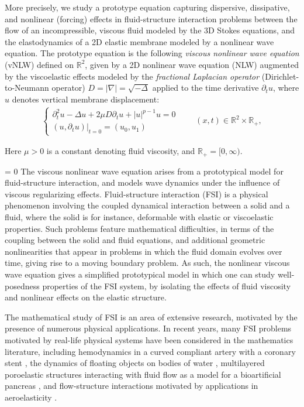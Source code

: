 \documentclass[letterpaper, 11pt,  reqno]{amsart}
\newcommand{\1}{\hspace{0.5mm}\text{I}\hspace{0.2mm}}
\newcommand{\noi}{\noindent}
\newcommand{\R}{\mathbb{R}}
\newcommand{\nb}{\nabla}
\newcommand{\Dl}{\Delta}
\newcommand{\dt}{\partial_t}
\numberwithin{equation}{section}
\numberwithin{theorem}{section}
\begin{document}
More precisely, we study a prototype equation capturing dispersive, dissipative, and nonlinear (forcing) 
effects in fluid-structure interaction problems between the flow of an incompressible, viscous fluid modeled by the 3D Stokes equations, 
and the elastodynamics of a 2D elastic membrane modeled by a nonlinear wave equation. 
The prototype equation is 
the following  {\emph{viscous nonlinear wave equation}} (vNLW) defined on $\R^2$, given by a 2D nonlinear wave equation (NLW)
augmented by the viscoelastic effects modeled by the {\emph{fractional Laplacian operator}} 
(Dirichlet-to-Neumann operator) $D = |\nb| = \sqrt{-\Dl}$ applied to the time derivative $\dt u$, where $u$ denotes vertical membrane displacement:
\begin{align}
\begin{cases}
\dt^2 u - \Dl  u  + 2\mu D \dt u  + |u|^{p-1}u  = 0\\
(u, \dt u)|_{t = 0} = (u_0, u_1)
\end{cases}
\qquad (x, t) \in \R^2 \times \R_+, 
\label{vNLW1}
\end{align}


\noi
Here $\mu > 0$ is a constant denoting fluid viscosity, and $\R_+ = [0, \infty)$.

 = 0
The viscous nonlinear wave equation arises from a prototypical model for fluid-structure interaction, and models wave dynamics under the influence of viscous regularizing effects. Fluid-structure interaction (FSI) is a physical phenomenon involving the coupled dynamical interaction between a solid and a fluid, where the solid is for instance, deformable with elastic or viscoelastic properties. Such problems feature mathematical difficulties, in terms of the coupling between the solid and fluid equations, and additional geometric nonlinearities that appear in problems in which the fluid domain evolves over time, giving rise to a moving boundary problem. As such, the nonlinear viscous wave equation gives a simplified prototypical model in which one can study well-posedness properties of the FSI system, by isolating the effects of fluid viscosity and nonlinear effects on the elastic structure. 

The mathematical study of FSI is an area of extensive research, motivated by the presence of numerous physical applications. In recent years, many FSI problems motivated by real-life physical systems have been considered in the mathematics literature, including hemodynamics in a curved compliant artery with a coronary stent \cite{CanicCMAME}, the dynamics of floating objects on bodies of water \cite{Lannes}, multilayered poroelastic structures interacting with fluid flow as a model for a bioartificial pancreas \cite{BCMW}, and flow-structure interactions motivated by applications in aeroelasticity \cite{LasieckaAbsorbing, LasieckaSupersonic, LasieckaLongTime, LasieckaRotational, WebsterSubsonic}.
\end{document}
